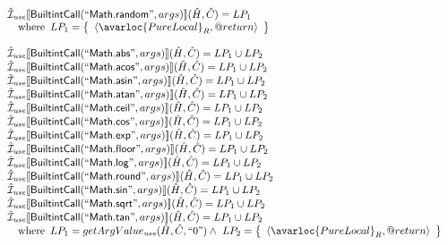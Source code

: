 \[
\begin{array}{l}

\aI_{\it use}\lbr \SF{BuiltintCall}(``\SF{Math.random}",args)\rbr(\hat{H},\hat{C}) = LP_1\\
\quad\wherec{
  LP_1 = \set{\langle\avarloc{PureLocal}_R,\varprop{return}\rangle}\\
  }\\
\\

\aI_{\it use}\lbr \SF{BuiltintCall}(``\SF{Math.abs}",args)\rbr(\hat{H},\hat{C}) = LP_1 \cup LP_2\\
\aI_{\it use}\lbr \SF{BuiltintCall}(``\SF{Math.acos}",args)\rbr(\hat{H},\hat{C}) = LP_1 \cup LP_2\\
\aI_{\it use}\lbr \SF{BuiltintCall}(``\SF{Math.asin}",args)\rbr(\hat{H},\hat{C}) = LP_1 \cup LP_2\\
\aI_{\it use}\lbr \SF{BuiltintCall}(``\SF{Math.atan}",args)\rbr(\hat{H},\hat{C}) = LP_1 \cup LP_2\\
\aI_{\it use}\lbr \SF{BuiltintCall}(``\SF{Math.ceil}",args)\rbr(\hat{H},\hat{C}) = LP_1 \cup LP_2\\
\aI_{\it use}\lbr \SF{BuiltintCall}(``\SF{Math.cos}",args)\rbr(\hat{H},\hat{C}) = LP_1 \cup LP_2\\
\aI_{\it use}\lbr \SF{BuiltintCall}(``\SF{Math.exp}",args)\rbr(\hat{H},\hat{C}) = LP_1 \cup LP_2\\  
\aI_{\it use}\lbr \SF{BuiltintCall}(``\SF{Math.floor}",args)\rbr(\hat{H},\hat{C}) = LP_1 \cup LP_2\\ 
\aI_{\it use}\lbr \SF{BuiltintCall}(``\SF{Math.log}",args)\rbr(\hat{H},\hat{C}) = LP_1 \cup LP_2\\
\aI_{\it use}\lbr \SF{BuiltintCall}(``\SF{Math.round}",args)\rbr(\hat{H},\hat{C}) = LP_1 \cup LP_2\\
\aI_{\it use}\lbr \SF{BuiltintCall}(``\SF{Math.sin}",args)\rbr(\hat{H},\hat{C}) = LP_1 \cup LP_2\\
\aI_{\it use}\lbr \SF{BuiltintCall}(``\SF{Math.sqrt}",args)\rbr(\hat{H},\hat{C}) = LP_1 \cup LP_2\\
\aI_{\it use}\lbr \SF{BuiltintCall}(``\SF{Math.tan}",args)\rbr(\hat{H},\hat{C}) = LP_1 \cup LP_2\\
\quad\wherec{
  LP_1 = getArgValue_{\it use}(\hat{H}, \hat{C}, ``0")
  \land\ LP_2 = \set{\langle\avarloc{PureLocal}_R,\varprop{return}\rangle}\\
  }\\
\\
  

\end{array}\]
